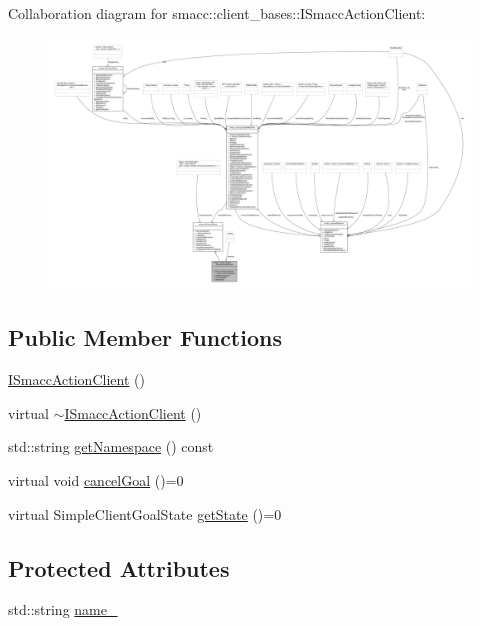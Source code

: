 Collaboration diagram for smacc\+:\+:client\+\_\+bases\+:\+:I\+Smacc\+Action\+Client\+:
\nopagebreak
\begin{figure}[H]
\begin{center}
\leavevmode
\includegraphics[width=350pt]{classsmacc_1_1client__bases_1_1ISmaccActionClient__coll__graph}
\end{center}
\end{figure}
\subsection*{Public Member Functions}
\begin{DoxyCompactItemize}
\item 
\hyperlink{classsmacc_1_1client__bases_1_1ISmaccActionClient_a379f2672d1b971422821026ca90eb96a}{I\+Smacc\+Action\+Client} ()
\item 
virtual \hyperlink{classsmacc_1_1client__bases_1_1ISmaccActionClient_a258324a60e2939b3fef3cb9b4b1730e5}{$\sim$\+I\+Smacc\+Action\+Client} ()
\item 
std\+::string \hyperlink{classsmacc_1_1client__bases_1_1ISmaccActionClient_ab6185745af5f3d060eb7401fd02a2ecc}{get\+Namespace} () const 
\item 
virtual void \hyperlink{classsmacc_1_1client__bases_1_1ISmaccActionClient_ac4880d5bb0e8a343d323a6c46984476d}{cancel\+Goal} ()=0
\item 
virtual Simple\+Client\+Goal\+State \hyperlink{classsmacc_1_1client__bases_1_1ISmaccActionClient_a7380270966cec25f03ec288c747a2d7e}{get\+State} ()=0
\end{DoxyCompactItemize}
\subsection*{Protected Attributes}
\begin{DoxyCompactItemize}
\item 
std\+::string \hyperlink{classsmacc_1_1client__bases_1_1ISmaccActionClient_a74c660a4c111a3b8858b9b7b1cedc866}{name\+\_\+}
\end{DoxyCompactItemize}


